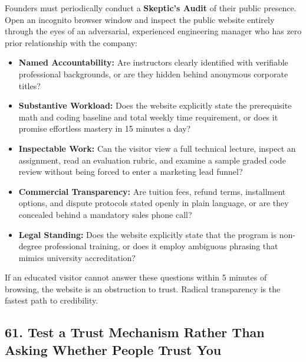 Founders must periodically conduct a \textbf{Skeptic's Audit} of their public presence. Open an incognito browser window and inspect the public website entirely through the eyes of an adversarial, experienced engineering manager who has zero prior relationship with the company:
\begin{itemize}
\item \textbf{Named Accountability:} Are instructors clearly identified with verifiable professional backgrounds, or are they hidden behind anonymous corporate titles?
\item \textbf{Substantive Workload:} Does the website explicitly state the prerequisite math and coding baseline and total weekly time requirement, or does it promise effortless mastery in 15 minutes a day?
\item \textbf{Inspectable Work:} Can the visitor view a full technical lecture, inspect an assignment, read an evaluation rubric, and examine a sample graded code review without being forced to enter a marketing lead funnel?
\item \textbf{Commercial Transparency:} Are tuition fees, refund terms, installment options, and dispute protocols stated openly in plain language, or are they concealed behind a mandatory sales phone call?
\item \textbf{Legal Standing:} Does the website explicitly state that the program is non-degree professional training, or does it employ ambiguous phrasing that mimics university accreditation?
\end{itemize}

If an educated visitor cannot answer these questions within 5 minutes of browsing, the website is an obstruction to trust. Radical transparency is the fastest path to credibility.

\subsection*{61. Test a Trust Mechanism Rather Than Asking Whether People Trust You}

